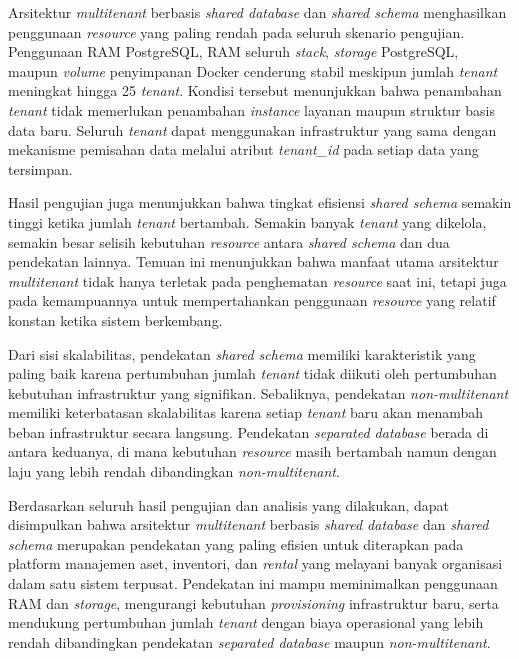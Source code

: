 Arsitektur \textit{multitenant} berbasis \textit{shared database} dan \textit{shared schema} menghasilkan penggunaan \textit{resource} yang paling rendah pada seluruh skenario pengujian. Penggunaan RAM PostgreSQL, RAM seluruh \textit{stack}, \textit{storage} PostgreSQL, maupun \textit{volume} penyimpanan Docker cenderung stabil meskipun jumlah \textit{tenant} meningkat hingga 25 \textit{tenant}. Kondisi tersebut menunjukkan bahwa penambahan \textit{tenant} tidak memerlukan penambahan \textit{instance} layanan maupun struktur basis data baru. Seluruh \textit{tenant} dapat menggunakan infrastruktur yang sama dengan mekanisme pemisahan data melalui atribut \textit{tenant\_id} pada setiap data yang tersimpan.

Hasil pengujian juga menunjukkan bahwa tingkat efisiensi \textit{shared schema} semakin tinggi ketika jumlah \textit{tenant} bertambah. Semakin banyak \textit{tenant} yang dikelola, semakin besar selisih kebutuhan \textit{resource} antara \textit{shared schema} dan dua pendekatan lainnya. Temuan ini menunjukkan bahwa manfaat utama arsitektur \textit{multitenant} tidak hanya terletak pada penghematan \textit{resource} saat ini, tetapi juga pada kemampuannya untuk mempertahankan penggunaan \textit{resource} yang relatif konstan ketika sistem berkembang.

Dari sisi skalabilitas, pendekatan \textit{shared schema} memiliki karakteristik yang paling baik karena pertumbuhan jumlah \textit{tenant} tidak diikuti oleh pertumbuhan kebutuhan infrastruktur yang signifikan. Sebaliknya, pendekatan \textit{non-multitenant} memiliki keterbatasan skalabilitas karena setiap \textit{tenant} baru akan menambah beban infrastruktur secara langsung. Pendekatan \textit{separated database} berada di antara keduanya, di mana kebutuhan \textit{resource} masih bertambah namun dengan laju yang lebih rendah dibandingkan \textit{non-multitenant}.

Berdasarkan seluruh hasil pengujian dan analisis yang dilakukan, dapat disimpulkan bahwa arsitektur \textit{multitenant} berbasis \textit{shared database} dan \textit{shared schema} merupakan pendekatan yang paling efisien untuk diterapkan pada platform manajemen aset, inventori, dan \textit{rental} yang melayani banyak organisasi dalam satu sistem terpusat. Pendekatan ini mampu meminimalkan penggunaan RAM dan \textit{storage}, mengurangi kebutuhan \textit{provisioning} infrastruktur baru, serta mendukung pertumbuhan jumlah \textit{tenant} dengan biaya operasional yang lebih rendah dibandingkan pendekatan \textit{separated database} maupun \textit{non-multitenant}.
